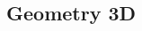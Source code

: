 \documentclass[10pt]{extarticle}
\begin{document}
\begin{multicols*}{2}

\setlength{\parskip}{0.0in}
\tableofcontents
\setlength{\parskip}{0.1in}

\section{Geometry 3D}



\end{multicols*}
\end{document}
